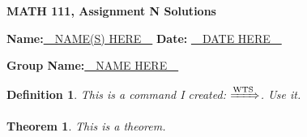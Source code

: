 \documentclass[11pt]{amsart}
\newtheorem{definition}{Definition}
\newtheorem{theorem}{Theorem}
\newcommand{\WTS}{\xRightarrow[]{\text{WTS}}}
\begin{document}
\begin{center}
\textbf{MATH 111, Assignment N Solutions}%
\end{center}

\vspace{.3 in}

\textbf{Name:}\underline{~~NAME(S) HERE~~} \hspace{1in} \textbf{Date:} \underline{~~DATE HERE~~}%

\textbf{Group Name:}\underline{~~NAME HERE~~}

\vspace{.3in}

\begin{definition}
This is a command I created: $\WTS$. Use it.
\end{definition}

\begin{theorem}
This is a theorem.
\end{theorem}

\vspace{.3in}
\end{document}
